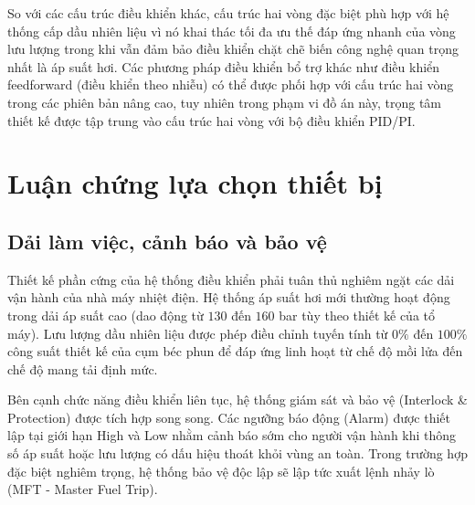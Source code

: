 \documentclass[../main.tex]{subfiles}
\begin{document}
So với các cấu trúc điều khiển khác, cấu trúc hai vòng đặc biệt phù hợp với hệ thống cấp dầu nhiên liệu vì nó khai thác tối đa ưu thế đáp ứng nhanh của vòng lưu lượng trong khi vẫn đảm bảo điều khiển chặt chẽ biến công nghệ quan trọng nhất là áp suất hơi. Các phương pháp điều khiển bổ trợ khác như điều khiển feedforward (điều khiển theo nhiễu) có thể được phối hợp với cấu trúc hai vòng trong các phiên bản nâng cao, tuy nhiên trong phạm vi đồ án này, trọng tâm thiết kế được tập trung vào cấu trúc hai vòng với bộ điều khiển PID/PI.

\section{Luận chứng lựa chọn thiết bị}

\subsection{Dải làm việc, cảnh báo và bảo vệ}

Thiết kế phần cứng của hệ thống điều khiển phải tuân thủ nghiêm ngặt các dải vận hành của nhà máy nhiệt điện. Hệ thống áp suất hơi mới thường hoạt động trong dải áp suất cao (dao động từ $130$ đến $160$ bar tùy theo thiết kế của tổ máy). Lưu lượng dầu nhiên liệu được phép điều chỉnh tuyến tính từ $0\%$ đến $100\%$ công suất thiết kế của cụm béc phun để đáp ứng linh hoạt từ chế độ mồi lửa đến chế độ mang tải định mức.

Bên cạnh chức năng điều khiển liên tục, hệ thống giám sát và bảo vệ (Interlock \& Protection) được tích hợp song song. Các ngưỡng báo động (Alarm) được thiết lập tại giới hạn High và Low nhằm cảnh báo sớm cho người vận hành khi thông số áp suất hoặc lưu lượng có dấu hiệu thoát khỏi vùng an toàn. Trong trường hợp đặc biệt nghiêm trọng, hệ thống bảo vệ độc lập sẽ lập tức xuất lệnh nhảy lò (MFT - Master Fuel Trip).
\end{document}
